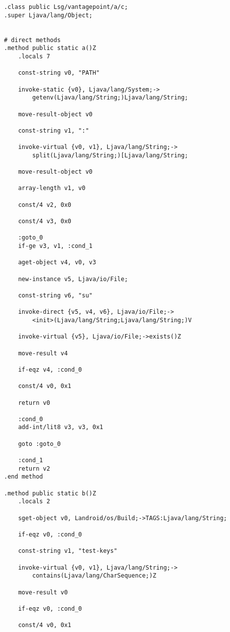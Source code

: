 \begin{verbatim}
.class public Lsg/vantagepoint/a/c;
.super Ljava/lang/Object;


# direct methods
.method public static a()Z
    .locals 7

    const-string v0, "PATH"

    invoke-static {v0}, Ljava/lang/System;->
        getenv(Ljava/lang/String;)Ljava/lang/String;

    move-result-object v0

    const-string v1, ":"

    invoke-virtual {v0, v1}, Ljava/lang/String;->
        split(Ljava/lang/String;)[Ljava/lang/String;

    move-result-object v0

    array-length v1, v0

    const/4 v2, 0x0

    const/4 v3, 0x0

    :goto_0
    if-ge v3, v1, :cond_1

    aget-object v4, v0, v3

    new-instance v5, Ljava/io/File;

    const-string v6, "su"

    invoke-direct {v5, v4, v6}, Ljava/io/File;->
        <init>(Ljava/lang/String;Ljava/lang/String;)V

    invoke-virtual {v5}, Ljava/io/File;->exists()Z

    move-result v4

    if-eqz v4, :cond_0

    const/4 v0, 0x1

    return v0

    :cond_0
    add-int/lit8 v3, v3, 0x1

    goto :goto_0

    :cond_1
    return v2
.end method

.method public static b()Z
    .locals 2

    sget-object v0, Landroid/os/Build;->TAGS:Ljava/lang/String;

    if-eqz v0, :cond_0

    const-string v1, "test-keys"

    invoke-virtual {v0, v1}, Ljava/lang/String;->
        contains(Ljava/lang/CharSequence;)Z

    move-result v0

    if-eqz v0, :cond_0

    const/4 v0, 0x1


\end{verbatim}
